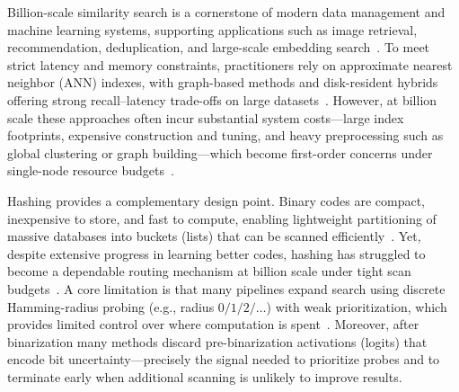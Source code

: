 \documentclass[sigconf, nonacm]{acmart}
\begin{document}
Billion-scale similarity search is a cornerstone of modern data management and machine learning systems, supporting applications such as image retrieval, recommendation, deduplication, and large-scale embedding search~\cite{ref15,10.1145/3448016.3457550,simhadri2022bigann}.
To meet strict latency and memory constraints, practitioners rely on approximate nearest neighbor (ANN) indexes, with graph-based methods and disk-resident hybrids offering strong recall--latency trade-offs on large datasets~\cite{33,NEURIPS2019_09853c7f,wang2021comprehensivesurveyexperimentalcomparison,NEURIPS2021_299dc35e}.
However, at billion scale these approaches often incur substantial system costs---large index footprints, expensive construction and tuning, and heavy preprocessing such as global clustering or graph building---which become first-order concerns under single-node resource budgets~\cite{wang2021comprehensivesurveyexperimentalcomparison,10.14778/3594512.3594527,NEURIPS2019_09853c7f}.

Hashing provides a complementary design point.
Binary codes are compact, inexpensive to store, and fast to compute, enabling lightweight partitioning of massive databases into buckets (lists) that can be scanned efficiently~\cite{NIPS2008_d58072be,inproceedings2011,Liong_2015_CVPR}.
Yet, despite extensive progress in learning better codes, hashing has struggled to become a dependable routing mechanism at billion scale under tight scan budgets~\cite{10.14778/3594512.3594527,26}.
A core limitation is that many pipelines expand search using discrete Hamming-radius probing (e.g., radius $0/1/2/\ldots$) with weak prioritization, which provides limited control over where computation is spent~\cite{NIPS2008_d58072be,inproceedings2011,NIPS2012_59b90e10}.
Moreover, after binarization many methods discard pre-binarization activations (logits) that encode bit uncertainty---precisely the signal needed to prioritize probes and to terminate early when additional scanning is unlikely to improve results.
\end{document}
